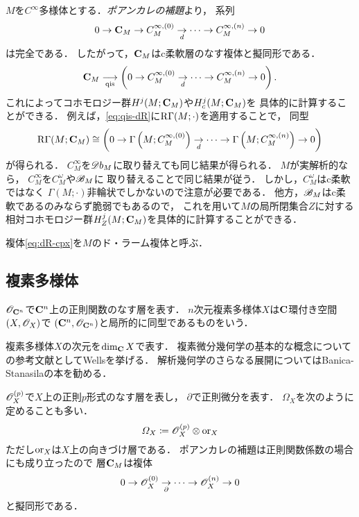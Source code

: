 \(M\)を\(C^\infty\)多様体とする．\emph{ポアンカレの補題}より，
系列
\begin{equation}\label{eq:dR-cpx}
    0\to\mathbf{C}_M
    \to C^{\infty,(0)}_M
    \underset{d}{\to}\dots\to
    C^{\infty,(n)}_M\to0
\end{equation}
は完全である．
したがって，\(\mathbf{C}_M\)はc柔軟層のなす複体と擬同形である．
\begin{equation}\label{eq:qis-dR}
    \mathbf{C}_M\underset{\text{qis}}{\longrightarrow}
    \left(0\to C^{\infty,(0)}_M
    \underset{d}{\to}\dots\to
    C^{\infty,(n)}_M\to0\right).
\end{equation}
これによってコホモロジー群\(H^j(M;\mathbf{C}_M)\)や\(H^j_c(M;\mathbf{C}_M)\)を
具体的に計算することができる．
例えば，\eqref{eq:qis-dR}に\(\mathop{\mathrm{R}\hspace{-0pt}\Gamma}\nolimits(M;\cdot)\)を適用することで，
同型
\begin{equation}
    \mathop{\mathrm{R}\hspace{-0pt}\Gamma}\nolimits(M;\mathbf{C}_M)
    \cong
    \left(0\to \Gamma\left(M;C^{\infty,(0)}_M\right)
    \underset{d}{\to}\dots\to
    \Gamma\left(M;C^{\infty,(n)}_M\right)\to0\right)
\end{equation}
が得られる．
\(C^{\infty}_M\)を\(\mathord{\mathscr{D}b}_M\)に取り替えても同じ結果が得られる．
\(M\)が実解析的なら，
\(C^{\infty}_M\)を\(C^{\omega}_M\)や\(\mathscr{B}_M\)に
取り替えることで同じ結果が従う．
しかし，\(C^{\omega}_M\)はc柔軟ではなく
\(\Gamma(M;\cdot)\)非輪状でしかないので注意が必要である．
他方，\(\mathscr{B}_M\)はc柔軟であるのみならず脆弱でもあるので，
これを用いて\(M\)の局所閉集合\(Z\)に対する
相対コホモロジー群\(H^j_Z(M;\mathbf{C}_M)\)を具体的に計算することができる．

複体\eqref{eq:dR-cpx}を\(M\)のド・ラーム複体と呼ぶ．





\subsection{複素多様体}

\(\mathscr{O}_{\mathbf{C}^n}\)で\(\mathbf{C}^n\)上の正則関数のなす層を表す．
\(n\)次元複素多様体\(X\)は\(\mathbf{C}\)環付き空間\((X,\mathscr{O}_X)\)で
\((\mathbf{C}^n,\mathscr{O}_{\mathbf{C}^n})\)と局所的に同型であるものをいう．

複素多様体\(X\)の次元を\(\dim_{\mathbf{C}} X\)で表す．
複素微分幾何学の基本的な概念についての参考文献としてWellsを挙げる．
解析幾何学のさらなる展開についてはBanica-Stanasilaの本を勧める．

\(\mathscr{O}_X^{(p)}\)で\(X\)上の正則\(p\)形式のなす層を表し，
\({\partial}\)で正則微分を表す．
\(\varOmega_X\)を次のように定めることも多い．
\begin{equation}
    \varOmega_X\coloneqq \mathscr{O}_X^{(p)}\otimes\mathord{\mathrm{or}}_X
\end{equation}
ただし\(\mathord{\mathrm{or}}_X\)は\(X\)上の向きづけ層である．
ポアンカレの補題は正則関数係数の場合にも成り立ったので
層\(\mathbf{C}_M\)は複体
\begin{equation}\label{eq:c-dR-cpx}
    0\to \mathscr{O}_X^{(0)}
    \underset{\partial}{\to}\dots\to
    \mathscr{O}_X^{(n)}\to0
\end{equation}
と擬同形である．

